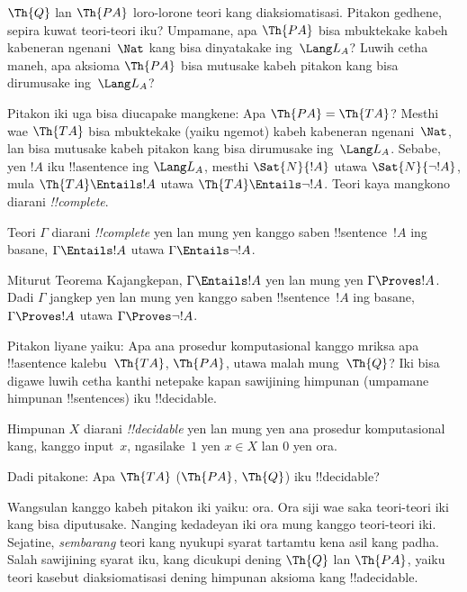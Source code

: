 \documentclass[../../../include/open-logic-section]{subfiles}
\begin{document}
$\Th{Q}$ lan $\Th{PA}$ loro-lorone teori
kang diaksiomatisasi. Pitakon gedhene,
sepira kuwat teori-teori iku? Umpamane,
apa $\Th{PA}$ bisa mbuktekake kabeh
kabeneran ngenani~$\Nat$ kang bisa
dinyatakake ing~$\Lang L_A$? Luwih
cetha maneh, apa aksioma $\Th{PA}$
bisa mutusake kabeh pitakon kang bisa
dirumusake ing~$\Lang L_A$?

Pitakon iki uga bisa diucapake mangkene:
Apa $\Th{PA} = \Th{TA}$? Mesthi wae
$\Th{TA}$ bisa mbuktekake (yaiku ngemot)
kabeh kabeneran ngenani~$\Nat$, lan bisa
mutusake kabeh pitakon kang bisa dirumusake
ing~$\Lang L_A$. Sebabe, yen $!A$ iku
!!a{sentence} ing $\Lang L_A$, mesthi
$\Sat{N}{!A}$ utawa $\Sat{N}{\lnot !A}$,
mula $\Th{TA} \Entails !A$ utawa
$\Th{TA} \Entails \lnot !A$. Teori
kaya mangkono diarani \emph{!!{complete}}.

\begin{defn}
Teori $\Gamma$ diarani \emph{!!{complete}}
yen lan mung yen kanggo saben
!!{sentence}~$!A$ ing basane,
$\Gamma \Entails !A$ utawa
$\Gamma \Entails \lnot !A$.
\end{defn}

\begin{explain}
Miturut Teorema Kajangkepan,
$\Gamma \Entails !A$ yen lan mung yen
$\Gamma \Proves !A$. Dadi $\Gamma$
jangkep yen lan mung yen kanggo saben
!!{sentence}~$!A$ ing basane,
$\Gamma \Proves !A$ utawa
$\Gamma \Proves \lnot !A$.
\end{explain}

Pitakon liyane yaiku: Apa ana prosedur komputasional
kanggo mriksa apa !!a{sentence} kalebu~$\Th{TA}$,
$\Th{PA}$, utawa malah mung~$\Th{Q}$?
Iki bisa digawe luwih cetha kanthi netepake
kapan sawijining himpunan (umpamane himpunan
!!{sentence}s) iku !!{decidable}.

\begin{defn}
Himpunan $X$ diarani \emph{!!{decidable}}
yen lan mung yen ana prosedur komputasional
kang, kanggo input~$x$, ngasilake~$1$
yen $x \in X$ lan $0$ yen ora.
\end{defn}

Dadi pitakone: Apa $\Th{TA}$
($\Th{PA}$, $\Th{Q}$) iku !!{decidable}?

Wangsulan kanggo kabeh pitakon iki yaiku: ora.
Ora siji wae saka teori-teori iki kang bisa
diputusake. Nanging kedadeyan iki ora mung
kanggo teori-teori iki. Sejatine, \emph{sembarang}
teori kang nyukupi syarat tartamtu kena asil
kang padha. Salah sawijining syarat iku,
kang dicukupi dening $\Th{Q}$ lan $\Th{PA}$,
yaiku teori kasebut diaksiomatisasi dening
himpunan aksioma kang !!a{decidable}.
\end{document}
